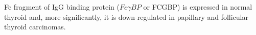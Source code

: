 \documentclass[jpm,article,submit,moreauthors,pdftex]{Definitions/mdpi}
\begin{document}
\begin{paracol}{2}



Fc fragment of IgG binding protein ($Fc\gamma BP$ or FCGBP) is expressed in normal thyroid and, more significantly, it is down-regulated in papillary and follicular thyroid carcinomas\cite{ODonovan2002}\cite{Griffith2006}.

 






\end{paracol}
\end{document}
